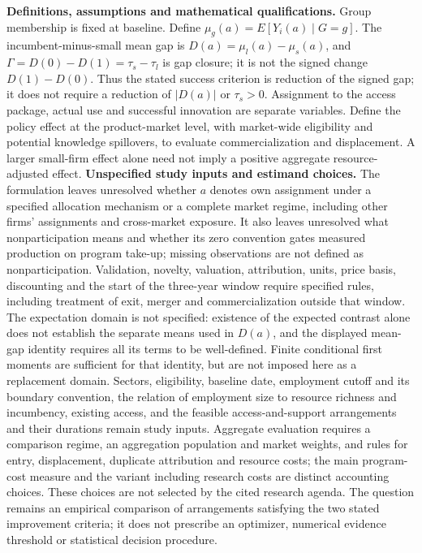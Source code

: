 \documentclass[11pt,a4paper]{article}
\begin{document}
\textbf{Definitions, assumptions and mathematical qualifications.} Group membership is fixed at baseline. Define \(\mu_g(a)=E[Y_i(a)\mid G=g]\). The incumbent-minus-small mean gap is \(D(a)=\mu_l(a)-\mu_s(a)\), and \(\Gamma=D(0)-D(1)=\tau_s-\tau_l\) is gap closure; it is not the signed change \(D(1)-D(0)\). Thus the stated success criterion is reduction of the signed gap; it does not require a reduction of \(|D(a)|\) or \(\tau_s>0\). Assignment to the access package, actual use and successful innovation are separate variables. Define the policy effect at the product-market level, with market-wide eligibility and potential knowledge spillovers, to evaluate commercialization and displacement. A larger small-firm effect alone need not imply a positive aggregate resource-adjusted effect.
\textbf{Unspecified study inputs and estimand choices.} The formulation leaves unresolved whether \(a\) denotes own assignment under a specified allocation mechanism or a complete market regime, including other firms' assignments and cross-market exposure. It also leaves unresolved what nonparticipation means and whether its zero convention gates measured production on program take-up; missing observations are not defined as nonparticipation. Validation, novelty, valuation, attribution, units, price basis, discounting and the start of the three-year window require specified rules, including treatment of exit, merger and commercialization outside that window. The expectation domain is not specified: existence of the expected contrast alone does not establish the separate means used in \(D(a)\), and the displayed mean-gap identity requires all its terms to be well-defined. Finite conditional first moments are sufficient for that identity, but are not imposed here as a replacement domain. Sectors, eligibility, baseline date, employment cutoff and its boundary convention, the relation of employment size to resource richness and incumbency, existing access, and the feasible access-and-support arrangements and their durations remain study inputs. Aggregate evaluation requires a comparison regime, an aggregation population and market weights, and rules for entry, displacement, duplicate attribution and resource costs; the main program-cost measure and the variant including research costs are distinct accounting choices. These choices are not selected by the cited research agenda. The question remains an empirical comparison of arrangements satisfying the two stated improvement criteria; it does not prescribe an optimizer, numerical evidence threshold or statistical decision procedure.
\end{document}
